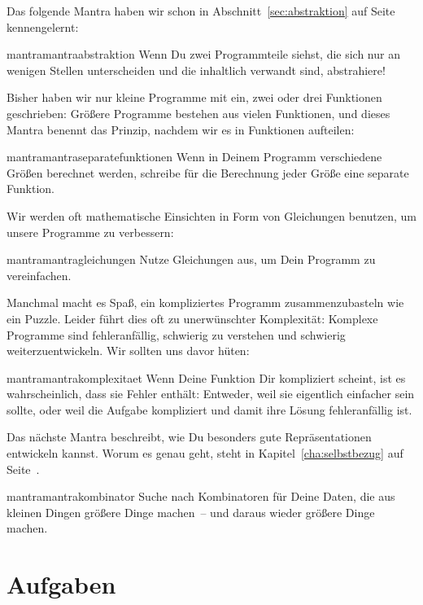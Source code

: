 Das folgende Mantra haben wir schon in Abschnitt~\ref{sec:abstraktion}
auf Seite~\pageref{sec:abstraktion} kennengelernt:
%
\begin{restatable}{mantra}{mantraabstraktion}
  \label{mantra:abstraktion}
  Wenn Du zwei Programmteile siehst, die sich nur an wenigen Stellen
  unterscheiden und die inhaltlich verwandt sind, abstrahiere!
\end{restatable}
%
\noindent Bisher haben wir nur kleine Programme mit ein, zwei oder drei
Funktionen geschrieben: Größere Programme bestehen aus vielen
Funktionen, und dieses Mantra benennt das Prinzip, nachdem wir es in
Funktionen aufteilen:
%
\begin{restatable}{mantra}{mantraseparatefunktionen}
  \label{mantra:separate-funktionen}
  Wenn in Deinem Programm verschiedene Größen berechnet werden,
  schreibe für die Berechnung jeder Größe eine separate Funktion.
\end{restatable}
%
\noindent Wir werden oft mathematische Einsichten in Form von Gleichungen
benutzen, um unsere Programme zu verbessern:
%
\begin{restatable}{mantra}{mantragleichungen}
  \label{mantra:gleichungen}
  Nutze Gleichungen aus, um Dein Programm zu vereinfachen.
\end{restatable}
%
\noindent Manchmal macht es Spaß, ein kompliziertes Programm zusammenzubasteln
wie ein Puzzle.  Leider führt dies oft zu unerwünschter Komplexität:
Komplexe Programme sind fehleranfällig, schwierig zu verstehen und
schwierig weiterzuentwickeln.  Wir sollten uns davor hüten:
%
\begin{restatable}{mantra}{mantrakomplexitaet}
  \label{mantra:komplexitaet}
  Wenn Deine Funktion Dir kompliziert scheint, ist es wahrscheinlich,
  dass sie Fehler enthält: Entweder, weil sie eigentlich einfacher
  sein sollte, oder weil die Aufgabe kompliziert und damit ihre Lösung
  fehleranfällig ist.
\end{restatable}
%
Das nächste Mantra beschreibt, wie Du besonders gute Repräsentationen
entwickeln kannst.  Worum es genau geht, steht in
Kapitel~\ref{cha:selbstbezug} auf Seite~\pageref{cha:selbstbezug}.
%
\begin{restatable}{mantra}{mantrakombinator}
  \label{mantra:kombinator}
  Suche nach Kombinatoren für Deine Daten, die aus
  kleinen Dingen größere Dinge machen~-- und daraus wieder größere
  Dinge machen.
\end{restatable}

\section*{Aufgaben}

